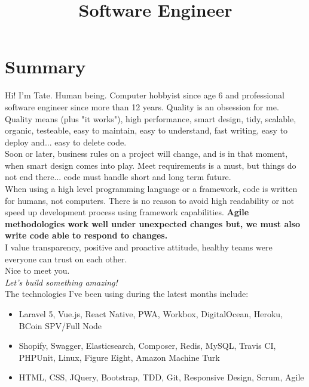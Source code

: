 \documentclass[11pt,a4paper,sans]{moderncv}        %
\title{Software Engineer}                               %
\begin{document}
\makecvtitle

\section{Summary}

Hi! I’m Tate. Human being. Computer hobbyist since age 6 and professional software engineer since more than 12 years.
Quality is an obsession for me. Quality means (plus "it works"), high performance, smart design, tidy, scalable, organic, testeable, easy to maintain, easy to understand, fast writing, easy to deploy and... easy to delete code.\\


Soon or later, business rules on a project will change, and is in that moment, when smart design comes into play.
Meet requirements is a must, but things do not end there... code must handle short and long term future.\\

When using a high level programming language or a framework, code is written for humans, not computers. There is no reason to avoid high readability or not speed up development process using framework capabilities.
\textbf{Agile methodologies work well under unexpected changes but, we must also write code able to respond to changes.}\\

I value transparency, positive and proactive attitude, healthy teams were everyone can trust on each other.\\

Nice to meet you.\\
\textit{Let's build something amazing!}\\

\medskip The technologies I've been using during the latest months include:
\begin{itemize}
  \item Laravel 5, Vue.js, React Native, PWA, Workbox, DigitalOcean, Heroku, BCoin SPV/Full Node
  \item Shopify, Swagger, Elasticsearch, Composer, Redis, MySQL, Travis CI, PHPUnit, Linux, Figure Eight, Amazon Machine Turk
  \item HTML, CSS, JQuery, Bootstrap, TDD, Git, Responsive Design, Scrum, Agile
\end{itemize}
\end{document}
